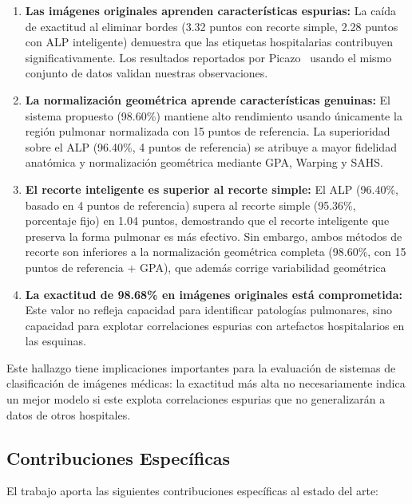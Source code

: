 \begin{enumerate}
    \item \textbf{Las imágenes originales aprenden características espurias:} La caída de exactitud al eliminar bordes (3.32 puntos con recorte simple, 2.28 puntos con ALP inteligente) demuestra que las etiquetas hospitalarias contribuyen significativamente. Los resultados reportados por Picazo~\cite{picazo2023tesis} usando el mismo conjunto de datos validan nuestras observaciones.

    \item \textbf{La normalización geométrica aprende características genuinas:} El sistema propuesto (98.60\%) mantiene alto rendimiento usando únicamente la región pulmonar normalizada con 15 puntos de referencia. La superioridad sobre el ALP (96.40\%, 4 puntos de referencia) se atribuye a mayor fidelidad anatómica y normalización geométrica mediante GPA, Warping y SAHS.

    \item \textbf{El recorte inteligente es superior al recorte simple:} El ALP (96.40\%, basado en 4 puntos de referencia) supera al recorte simple (95.36\%, porcentaje fijo) en 1.04 puntos, demostrando que el recorte inteligente que preserva la forma pulmonar es más efectivo. Sin embargo, ambos métodos de recorte son inferiores a la normalización geométrica completa (98.60\%, con 15 puntos de referencia + GPA), que además corrige variabilidad geométrica

    \item \textbf{La exactitud de 98.68\% en imágenes originales está comprometida:} Este valor no refleja capacidad para identificar patologías pulmonares, sino capacidad para explotar correlaciones espurias con artefactos hospitalarios en las esquinas.
\end{enumerate}

Este hallazgo tiene implicaciones importantes para la evaluación de sistemas de clasificación de imágenes médicas: la exactitud más alta no necesariamente indica un mejor modelo si este explota correlaciones espurias que no generalizarán a datos de otros hospitales.

\subsection{Contribuciones Específicas}
\label{subsec:contribuciones_especificas}

El trabajo aporta las siguientes contribuciones específicas al estado del arte:

